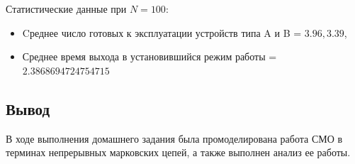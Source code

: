 Статистические данные при $N=100$:
\begin{itemize}
    \item Cреднее число готовых к эксплуатации устройств типа A и B = $ 3.96, 3.39 $,
    \item Среднее время выхода в установившийся режим работы = $ 2.3868694724754715 $
\end{itemize}
\subsection{Вывод}
В ходе выполнения домашнего задания была промоделирована работа СМО в терминах непрерывных марковских цепей,
а также выполнен анализ ее работы.

